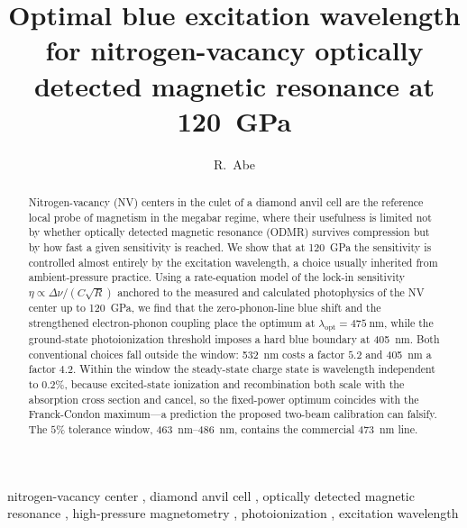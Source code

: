 \documentclass[preprint,12pt]{elsarticle}
\newcommand{\lopt}{\ensuremath{\lambda_{\mathrm{opt}}}}
\begin{document}
\begin{frontmatter}

\title{Optimal blue excitation wavelength for nitrogen-vacancy optically
detected magnetic resonance at 120~GPa}

\author[isct]{R.~Abe}
\address[isct]{Institute of Science Tokyo, Tokyo, Japan}

\begin{abstract}
Nitrogen-vacancy (NV) centers in the culet of a diamond anvil cell are the
reference local probe of magnetism in the megabar regime, where their usefulness
is limited not by whether optically detected magnetic resonance (ODMR) survives
compression but by how fast a given sensitivity is reached. We show that at
\SI{120}{\giga\pascal} the sensitivity is controlled almost entirely by the
excitation wavelength, a choice usually inherited from ambient-pressure practice.
Using a rate-equation model of the lock-in sensitivity
$\eta \propto \Delta\nu/(C\sqrt{R})$ anchored to the measured and calculated
photophysics of the NV center up to \SI{120}{\giga\pascal}, we find that the
zero-phonon-line blue shift and the strengthened electron-phonon coupling place
the optimum at $\lopt = \SI{475}{\nano\meter}$, while the ground-state
photoionization threshold imposes a hard blue boundary at \SI{405}{\nano\meter}.
Both conventional choices fall outside the window: \SI{532}{\nano\meter} costs a
factor $5.2$ and \SI{405}{\nano\meter} a factor $4.2$. Within the window the
steady-state charge state is wavelength independent to $0.2\%$, because
excited-state ionization and recombination both scale with the absorption cross
section and cancel, so the fixed-power optimum coincides with the Franck-Condon
maximum---a prediction the proposed two-beam calibration can falsify. The $5\%$
tolerance window, \SIrange{463}{486}{\nano\meter}, contains the commercial
\SI{473}{\nano\meter} line.
\end{abstract}

\begin{keyword}
nitrogen-vacancy center \sep
diamond anvil cell \sep
optically detected magnetic resonance \sep
high-pressure magnetometry \sep
photoionization \sep
excitation wavelength
\end{keyword}

\end{frontmatter}

\end{document}
